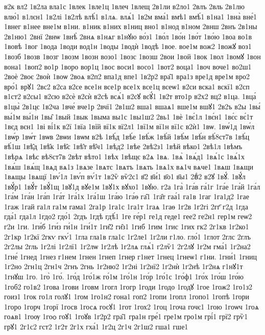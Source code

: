 {в2к
вл2
1в2ла
вла1с
1влек
1вле1ц
1влеч
1влещ
2в1ли
в2ло1
2влъ
2вль
2в1лю
влю́1
в1лєн1
1в2лі
1в2лѣ
влѣ́1
в1лѧ.
влѧ́1
1в2м
вма́1
вмѣ1
вмѣ́1
в1на1
1вна̀
вне́1
1внег
в1нее
вне1м
в1ни.
в1ник
в1них
в1ниц
вно1
в1нод
в1ном
2внш
2внъ
2в1ны
2в1ню1
2внї
2внѡ
1внѣ̀
2внѧ
в1нѧг
в1нꙋю
во́з1
1во́л
1во́н
1во́т
1во́ю
1воа
во1в
1вовѣ
1вог
1вода
1води
вод1н
1воды
1водѝ
1водѣ
1вое.
вое1м
вож2
1вожꙋ
воз1
1возб
1возв
1возг
1возм
1возн
возо1
1возс
1возш
2вои
1вой
1вок
1вол
1вомꙋ
1вон
вона1
1воп2
во1р
1воро
вор1ц
1вос
воси1
восо1
1вот2
воца1
1воч
воче1
во2ш1
2воѐ
2воє
2воѝ
1воѡ
2воѧ
в2п2
впа1д
впе1
1в2р2
вра̑1
вра1з
вре1д
вре1м
вро2
вро́1
врꙋ1
2вс2
в2са
в2се
все1н
все1р
все1х
все1ц
всеѡ1
в2си
вска1
вскї1
в2сп
в1ст2
в2сы1
в2сю
в2сѐ
в2сѝ
в2сѣ
всѧ́1
в2сꙋ
всꙋ́1
1в2т
вто1р
в2х2
вц2
в1ца.
1вца́
в1цы̀
2в1цє
1в2ча
1вче́
вче1р
2вчї1
2в1ш2
вша1
вшаѧ1
вше1м
вшꙋ1
2в2ъ
в2ы
1вы́
вы́1м
вы́1н
1вы̑
1вый
1вык
1выма
вы1с
1вы1ш2
2вь1
1вѐ
1вє́1л
1вє́н1
1вє́с
вє́1т
1вєд
вєн1
1ві
ві́1к
в2ї
1вїа
1вїй
вї1к
вї2л1
1вї1м
вї1н
вї1с
в2ѝ1
1вѡ.
1вѡ́1д
1вѡ́л
1вѡ́р
1вѡ́т
1вѡв
2вѡи
1вѡм
в2ѣ
1вѣ́д
1вѣ́е
1вѣ́ж
1вѣ́й
1вѣ́м
1вѣ́н
вѣ́8ст7в
1вѣ́ц
вѣ́1ш
1вѣ̑д
1вѣ̑к
1вѣ̑с
1вѣ̑т
вѣ̑ч1
1вѣд2
1вѣе
2вѣ2з1
1вѣй
вѣко1
2вѣ1л
1вѣмъ
1вѣрѧ
1вѣс
вѣ8ст7в
2вѣт
вѣто1
1вѣх
1вѣщє
в2ѧ
1вѧ.
1вѧ̀
1вѧ́д1
1вѧ́1с
1вѧ́1х
1вѧ́ш
1вѧ́щ
1вѧд
вѧ1з
1вѧзе
1вѧтс
1вѧтъ
1вѧть
1вѧ1х
вѧ1ч
вѧче1
1вѧш
1вѧщи
1вѧщы
1вѧщї
1вѵ́1л
1вѵ́п
вѵ́1т
1в2ѷ
вѷ2с1
в҃2
в҃и́1
в҃о1
в҃ы1
2вⷣ2
в2ꙋ
1вꙋ́.
1вꙋ́л
1вꙋ́р1
1вꙋ́т
1вꙋ́1щ
1вꙋ1д
вꙋе1м
1вꙋ1х
вꙋхо1
1вꙋю.
г2а
1га̀
1га́в
га́1г
1га́е
1га́й
1га́л
1га́м
1га́н
1га́п
1га́т
1га́1х
1га́1ш
1га́ю
1га́ѳ
га̑1
1га̑т
гаа́1
га1в
1гаг
1га1д2
1гае
1гаж
1гай
га1л
га1м
гама1
2га1р
1га1с
1га1т
1гаѧ
1гаѳ
1г2в
1г2гі
2гг҃
г2д
1гда
гда́1
гда1л
1гдо2
гдо́1
2гдъ
1гдѣ
гдѣ́1
1ге
ге́р1
ге1д
геде1
гее2
ге2н1
гер1м
геѡ2
г2и
1ги.
1ги́б
1ги́з
ги́1н
1ги́1т
1ги̑2
ги̑з1
1гиб
1гим
1гис
1гих
гк2
2г1кв
1г2ко1
2г1кр
1г2кї
2гкѵ
гкѵ́1
1гла
гла1в
гла1с
1г2ле1
1г2ли
г1ло.
гло́1
1глот
2глс
2глъ
2г2лы
2гль
1г2лі
1г2лї1
1г2лѡ
1г2лѣ
1г2лѧ
глѧ́1
г2лѷ1
2г2лꙋ
1г2м
гма́1
1г2на2
1гне́
1гнед
1гнез
г1нем
1гнен
1гнеп
1гнер
г1нет
1гнец
1гнеѡ1
г1ни.
1гни́1
1гниц
1г2но
2гн1ц
2гн1ч
2гнъ
2гнь
1г2ню2
1г2ні
1г2нї2
1г2нѝ
1г2нѣ
1г2нѧ
г1нꙋ1т
1гнꙋш
1го.
1го̀
1го́.
1го́д
1го́1ж
го́1м
1го́1н
1го́р
1го́1с
1го́ф1
1го́х
1го́ш
1го́ю
1гоб2
го1в2
1гова
1гови
1говм
1гогл
1гогр
1годи
1годо
1годꙋ
1гое
1гож2
1го1з2
гоиз1
1гок
го1л
голꙋ1
1гом
1го1н2
гона1
гоп2
1гопи
1гопл
1гопо1
1гопѣ
1гори
1горо
1горч
1горї
1госв
1госѧ
госꙋ1
1гот
1гох2
1гоц
1гоча
гочє1
1гою
1гоѡч
1гоѧ
гоѧв1
1гоѹ
1гоѻ
гоꙋ1
1гоꙋв
1г2р2
гра̑1
гра1н
гре́1
гре1м
гро1м
грі́1
грї2
грѷ1
грꙋ1
2г1с2
гст2
1г2т
2г1х
гха́1
1г2ц
2г1ч
2г1ш2
гша1
гше1
}
